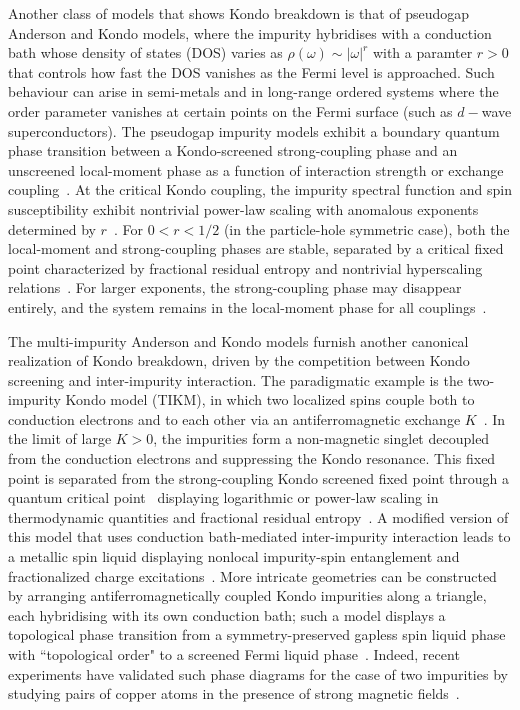 Another class of models that shows Kondo breakdown is that of pseudogap Anderson and Kondo models, where the impurity hybridises with a conduction bath whose density of states (DOS) varies as \(\rho(\omega)\sim |\omega|^r\) with a paramter \(r > 0\) that controls how fast the DOS vanishes as the Fermi level is approached. Such behaviour can arise in semi-metals and in long-range ordered systems where the order parameter vanishes at certain points on the Fermi surface (such as \(d-\)wave superconductors). The pseudogap impurity models exhibit a boundary quantum phase transition between a Kondo-screened strong-coupling phase and an unscreened local-moment phase as a function of interaction strength or exchange coupling~\cite{Withoff1990,GonzalezBuxton1998,Bulla1997,Ingersent1996}. At the critical Kondo coupling, the impurity spectral function and spin susceptibility exhibit nontrivial power-law scaling with anomalous exponents determined by $r$~\cite{GonzalezBuxton1998,Ingersent2002,Fritz2004,Parcollet1998,Si2001}. For $0<r<1/2$ (in the particle-hole symmetric case), both the local-moment and strong-coupling phases are stable, separated by a critical fixed point characterized by fractional residual entropy and nontrivial hyperscaling relations~\cite{GonzalezBuxton1998,Bulla2000}. For larger exponents, the strong-coupling phase may disappear entirely, and the system remains in the local-moment phase for all couplings~\cite{Ingersent1996}.

The multi-impurity Anderson and Kondo models furnish another canonical realization of Kondo breakdown, driven by the competition between Kondo screening and inter-impurity interaction. The paradigmatic example is the two-impurity Kondo model (TIKM), in which two localized spins couple both to conduction electrons and to each other via an antiferromagnetic exchange $K$~\cite{Jones1987,Jones1988}. In the limit of large $K > 0$, the impurities form a non-magnetic singlet decoupled from the conduction electrons and suppressing the Kondo resonance. This fixed point is separated from the strong-coupling Kondo screened fixed point through a quantum critical point~\cite{Jones1987,Jones1988,Affleck1992} displaying logarithmic or power-law scaling in thermodynamic quantities and fractional residual entropy~\cite{Affleck1995}. A modified version of this model that uses conduction bath-mediated inter-impurity interaction leads to a metallic spin liquid displaying nonlocal impurity-spin entanglement and fractionalized charge excitations~\cite{Wojcik2023}. More intricate geometries can be constructed by arranging antiferromagnetically coupled Kondo impurities along a triangle, each hybridising with its own conduction bath; such a model displays a topological phase transition from a symmetry-preserved gapless spin liquid phase with ``topological order" to a screened Fermi liquid phase~\cite{konig2021}. Indeed, recent experiments have validated such phase diagrams for the case of two impurities by studying pairs of copper atoms in the presence of strong magnetic fields~\cite{Spinelli2015}.

